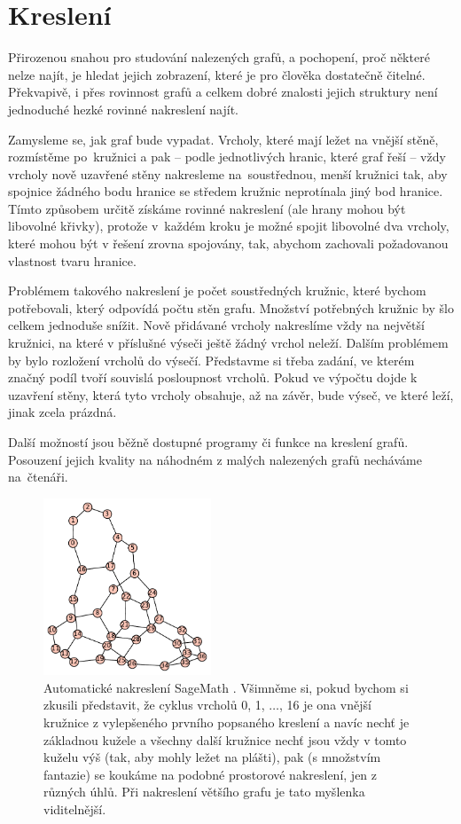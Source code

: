 
\chapter{Kreslení} \label{kresleni}

Přirozenou snahou pro studování nalezených grafů, a pochopení, proč některé nelze najít, je hledat jejich zobrazení, které je pro člověka dostatečně čitelné. Překvapivě, i přes rovinnost grafů a celkem dobré znalosti jejich struktury není jednoduché hezké rovinné nakreslení najít.

Zamysleme se, jak graf bude vypadat. Vrcholy, které mají ležet na vnější stěně, rozmístěme po~kružnici a pak -- podle jednotlivých hranic, které graf řeší -- vždy vrcholy nově uzavřené stěny nakresleme na~soustřednou, menší kružnici tak, aby spojnice žádného bodu hranice se středem kružnic neprotínala jiný bod hranice. Tímto způsobem určitě získáme rovinné nakreslení (ale hrany mohou být libovolné křivky), protože v~každém kroku je možné spojit libovolné dva vrcholy, které mohou být v řešení zrovna spojovány, tak, abychom zachovali požadovanou vlastnost tvaru hranice.

Problémem takového nakreslení je počet soustředných kružnic, které bychom potřebovali, který odpovídá počtu stěn grafu. Množství potřebných kružnic by šlo celkem jednoduše snížit. Nově přidávané vrcholy nakreslíme vždy na největší kružnici, na které v příslušné výseči ještě žádný vrchol neleží. Dalším problémem by bylo rozložení vrcholů do výsečí. Představme si třeba zadání, ve kterém značný podíl tvoří souvislá posloupnost  vrcholů. Pokud ve výpočtu dojde k uzavření stěny, která tyto vrcholy obsahuje, až na závěr, bude výseč, ve které leží, jinak zcela prázdná.

Další možností jsou běžně dostupné programy či funkce na kreslení grafů. Posouzení jejich kvality na náhodném z malých nalezených grafů necháváme na~čtenáři.


\begin{figure}[h]\centering
\includegraphics[width = 50mm]{../img/sageplot}
\caption{Automatické nakreslení SageMath \cite{sagemath}. Všimněme si, pokud bychom si zkusili představit, že cyklus vrcholů 0, 1, $\dots$, 16 je ona vnější kružnice z vylepšeného prvního popsaného kreslení a navíc nechť je základnou kužele a všechny další kružnice nechť jsou vždy v tomto kuželu výš (tak, aby mohly ležet na plášti), pak (s množstvím fantazie) se koukáme na podobné prostorové nakreslení, jen z různých úhlů. Při nakreslení většího grafu je tato myšlenka viditelnější.}
\label{obr:sageplot}
\end{figure}


